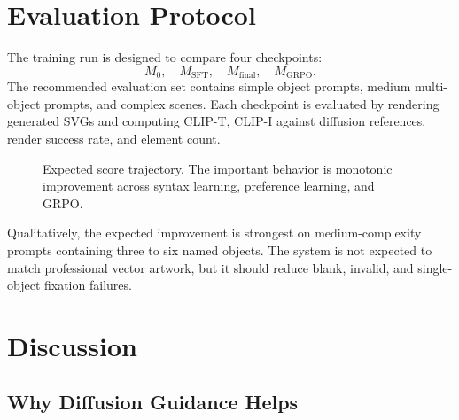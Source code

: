 \documentclass[10pt,twocolumn]{article}
\begin{document}
\section{Evaluation Protocol}

The training run is designed to compare four checkpoints:
\[
M_0,\quad M_{\mathrm{SFT}},\quad M_{\mathrm{final}},\quad
M_{\mathrm{GRPO}}.
\]
The recommended evaluation set contains simple object prompts, medium
multi-object prompts, and complex scenes. Each checkpoint is evaluated by
rendering generated SVGs and computing CLIP-T, CLIP-I against diffusion
references, render success rate, and element count.

\begin{figure}[t]
\centering
{}
\caption{Expected score trajectory. The important behavior is monotonic
improvement across syntax learning, preference learning, and GRPO.}
\label{fig:scores}
\end{figure}

Qualitatively, the expected improvement is strongest on medium-complexity
prompts containing three to six named objects. The system is not expected to
match professional vector artwork, but it should reduce blank, invalid, and
single-object fixation failures.

\section{Discussion}

\subsection{Why Diffusion Guidance Helps}
\end{document}
